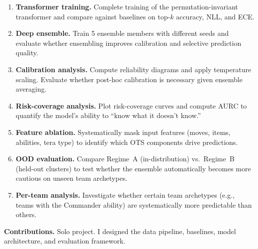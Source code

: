 \documentclass[11pt]{article}
\begin{document}
\begin{enumerate}
    \item \textbf{Transformer training.} Complete training of the permutation-invariant transformer and compare against baselines on top-$k$ accuracy, NLL, and ECE.
    \item \textbf{Deep ensemble.} Train 5 ensemble members with different seeds and evaluate whether ensembling improves calibration and selective prediction quality.
    \item \textbf{Calibration analysis.} Compute reliability diagrams and apply temperature scaling. Evaluate whether post-hoc calibration is necessary given ensemble averaging.
    \item \textbf{Risk-coverage analysis.} Plot risk-coverage curves and compute AURC to quantify the model's ability to ``know what it doesn't know.''
    \item \textbf{Feature ablation.} Systematically mask input features (moves, items, abilities, tera type) to identify which OTS components drive predictions.
    \item \textbf{OOD evaluation.} Compare Regime~A (in-distribution) vs.\ Regime~B (held-out clusters) to test whether the ensemble automatically becomes more cautious on unseen team archetypes.
    \item \textbf{Per-team analysis.} Investigate whether certain team archetypes (e.g., teams with the Commander ability) are systematically more predictable than others.
\end{enumerate}

\textbf{Contributions.}
Solo project. I designed the data pipeline, baselines, model architecture, and evaluation framework.

\end{document}
